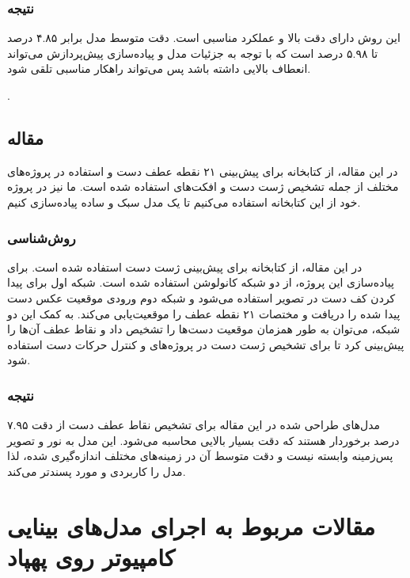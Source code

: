 \subsubsection{نتیجه}
این روش دارای دقت بالا و عملکرد مناسبی است. دقت متوسط مدل برابر  ۴.۸۵ درصد تا ۵.۹۸ درصد است که با توجه به جزئیات مدل و پیاده‌سازی پیش‌پردازش می‌تواند انعطاف بالایی داشته باشد پس می‌تواند راهکار مناسبی تلقی شود.


\cite{chen2021visual}.


\subsection{مقاله }
در این مقاله، از کتابخانه  برای پیش‌بینی ۲۱ نقطه عطف دست و استفاده در پروژه‌های مختلف از جمله تشخیص ژست دست و افکت‌های  استفاده شده است. ما نیز در پروژه خود از این کتابخانه استفاده می‌کنیم تا یک مدل سبک و ساده پیاده‌سازی کنیم.

\subsubsection{روش‌شناسی}
در این مقاله، از کتابخانه  برای پیش‌بینی ژست دست استفاده شده است. برای پیاده‌سازی این پروژه، از دو شبکه کانولوشن استفاده شده است. شبکه اول برای پیدا کردن کف دست در تصویر استفاده می‌شود و شبکه دوم ورودی 
موقعیت عکس دست پیدا شده را دریافت و مختصات ۲۱ نقطه عطف را موقعیت‌یابی می‌کند. به کمک این دو شبکه، می‌توان به طور همزمان موقعیت دست‌ها را تشخیص داد و 
نقاط عطف آن‌ها را پیش‌بینی کرد تا برای تشخیص ژست دست در پروژه‌های  و کنترل حرکات دست استفاده شود.

\subsubsection{نتیجه}
مدل‌های طراحی شده در این مقاله برای تشخیص نقاط عطف دست از دقت ۷.۹۵ درصد برخوردار هستند که دقت بسیار بالایی محاسبه می‌شود. این مدل به نور و تصویر پس‌زمینه 
وابسته نیست و دقت متوسط آن در زمینه‌های مختلف اندازه‌گیری شده، لذا مدل را کاربردی و مورد پسندتر می‌کند.

\cite{zhang2020mediapipe} 







\section{مقالات مربوط به اجرای مدل‌های بینایی کامپیوتر روی پهپاد}
